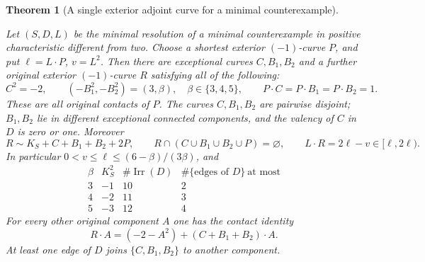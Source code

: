 \documentclass[11pt,reqno]{amsart}
\newtheorem{theorem}{Theorem}[section]
\theoremstyle{definition}
\theoremstyle{remark}
\DeclareMathOperator{\Irr}{Irr}
\numberwithin{equation}{section}
\begin{document}
\begin{theorem}[A single exterior adjoint curve for a minimal counterexample]
\label{thm:adjoint-reduction}

Let $(S,D,L)$ be the minimal resolution of a minimal counterexample in positive characteristic different from two. Choose a shortest
exterior $(-1)$-curve $P$, and put $\ell=L\cdot P$, $v=L^2$.
Then there are exceptional curves $C,B_1,B_2$ and a further original exterior
$(-1)$-curve $R$ satisfying all of the following:
\[
 C^2=-2,\qquad ( -B_1^2,-B_2^2 )=(3,\beta),\quad
 \beta\in\{3,4,5\},\qquad
 P\cdot C=P\cdot B_1=P\cdot B_2=1.
\]
These are all original contacts of $P$. The curves $C,B_1,B_2$ are
pairwise disjoint; $B_1,B_2$ lie in different exceptional connected components,
and the valency of $C$ in $D$ is zero or one. Moreover
\begin{equation}\label{eq:least-center-single-adjoint-configuration}
 R\sim K_S+C+B_1+B_2+2P,\qquad
 R\cap(C\cup B_1\cup B_2\cup P)=\varnothing,
 \qquad L\cdot R=2\ell-v\in[\ell,2\ell).
\end{equation}
In particular $0<v\le\ell\le(6-\beta)/(3\beta)$, and
\[
\begin{array}{c|c|c|c}
 \beta&K_S^2&\#\Irr(D)&\#\{\text{edges of }D\}\ \text{at most}\\\hline
 3&-1&10&2\\4&-2&11&3\\5&-3&12&4
\end{array}
\]
For every other original component $A$ one has the contact identity
\[
 R\cdot A=(-2-A^2)+(C+B_1+B_2)\cdot A.
\]
At least one edge of $D$ joins $\{C,B_1,B_2\}$ to another component.

\end{theorem}
\end{document}
